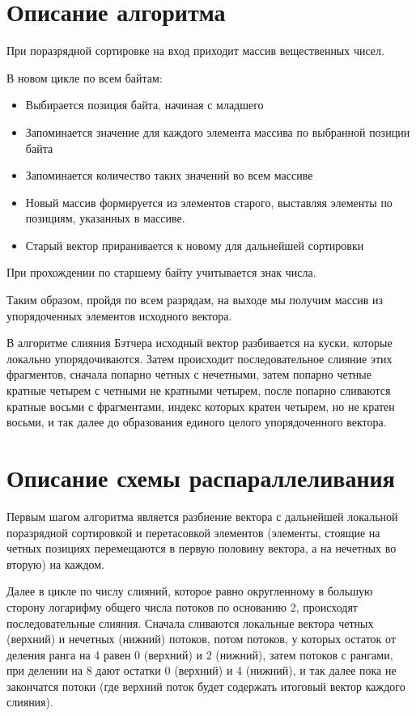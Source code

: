 \documentclass{report}
\begin{document}
	\section*{Описание алгоритма}
	При поразрядной сортировке на вход приходит массив вещественных чисел.
	\par В новом цикле по всем байтам:
	\begin{itemize}
		\item Выбирается позиция байта, начиная с младшего
		\item Запоминается значение для каждого элемента массива по выбранной позиции байта
		\item Запоминается количество таких значений во всем массиве
		\item Новый массив формируется из элементов старого, выставляя элементы по позициям, указанных в массиве.
		\item Старый вектор приранивается к новому для дальнейшей сортировки
	\end{itemize}
	\par При прохождении по старшему байту учитывается знак числа.
	\par Таким образом, пройдя по всем разрядам, на выходе мы получим массив из упорядоченных элементов исходного вектора.
	\par В алгоритме слияния Бэтчера исходный вектор разбивается на куски, которые локально упорядочиваются. Затем происходит последовательное слияние этих фрагментов, сначала попарно четных с нечетными, затем попарно четные кратные четырем с четными не кратными четырем, после попарно сливаются кратные восьми с фрагментами, индекс которых кратен четырем, но не кратен восьми, и так далее до образования единого целого упорядоченного вектора.
	\newpage
	
	\section*{Описание схемы распараллеливания}
	Первым шагом алгоритма является разбиение вектора с дальнейшей локальной поразрядной сортировкой и перетасовкой элементов (элементы, стоящие на четных позициях перемещаются в первую половину вектора, а на нечетных во вторую) на каждом.
	\par Далее в цикле по числу слияний, которое равно округленному в большую сторону логарифму общего числа потоков по основанию 2, происходят последовательные слияния. Сначала сливаются локальные вектора четных (верхний) и нечетных (нижний) потоков, потом потоков, у которых остаток от деления ранга на 4 равен 0 (верхний) и 2 (нижний), затем потоков с рангами, при делении на 8 дают остатки 0 (верхний) и 4 (нижний), и так далее пока не закончатся потоки (где верхний поток будет содержать итоговый вектор каждого слияния).
	\newpage
	
\end{document}
